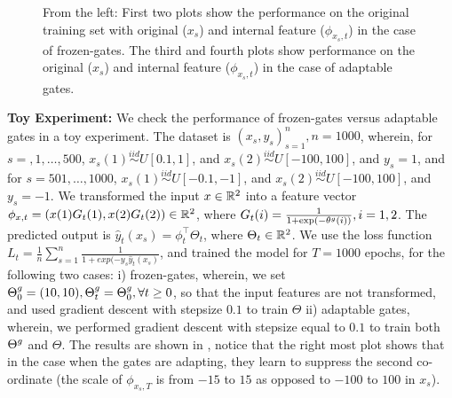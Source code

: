 \begin{figure}[h]
{\begin{tabular}{cccc}
\end{tabular}
}
\caption{From the left: First two plots show the performance on the original training set with original ($x_s$) and internal feature ($\phi_{x_s,t}$) in the case of frozen-gates. The third and fourth plots show performance on the original ($x_s$) and internal feature ($\phi_{x_s,t}$)  in the case of adaptable gates.}
\label{fig:feat}
\end{figure}

\textbf{Toy Experiment:} We check the performance of frozen-gates versus adaptable gates in a toy experiment. The dataset is $(x_s,y_s)_{s=1}^{n},n=1000$, wherein, for $s=,1,\ldots,500$, $x_s(1)\stackrel{iid}\sim U[0.1,1]$, and $x_s(2)\stackrel{iid}\sim U[-100,100]$, and $y_s=1$, and for $s=501,\ldots,1000$, $x_s(1)\stackrel{iid}\sim U[-0.1,-1]$, and $x_s(2)\stackrel{iid}\sim U[-100,100]$, and $y_s=-1$. We transformed the input $x\in \mathbb{R}^2$ into a feature vector $\phi_{x,t}=(x(1)G_t(1),x(2)G_t(2) )\in \mathbb{R}^2$, where $G_t(i)=\frac{1}{1+\exp(-\theta^g(i))},i=1,2$. The predicted output is $\hat{y}_{t}(x_s)=\phi^\top_t\Theta_t$, where $\Theta_t\in \mathbb{R}^2$. We use the loss function $L_t=\frac{1}{n}\sum_{s=1}^n\frac{1}{1+exp(-y_s\hat{y}_t(x_s)}$, and trained the model for $T=1000$ epochs, for the following two cases: i) frozen-gates, wherein, we set ${\Theta}^g_0=(10,10), {\Theta}^g_t={\Theta}^g_0,\forall t\geq 0$, so that the input features are not transformed, and used gradient descent with stepsize $0.1$ to train $\Theta$ ii) adaptable gates, wherein, we performed gradient descent with stepsize equal to $0.1$ to train both ${\Theta}^g$ and $\Theta$. The results are shown in , notice that the right most plot shows that in the case when the gates are adapting, they learn to suppress the second co-ordinate (the scale of $\phi_{x_s,T}$ is from $-15$ to $15$ as opposed to $-100$ to $100$ in $x_s$). 


